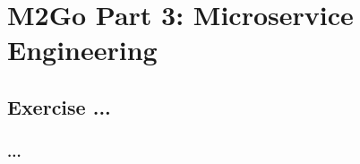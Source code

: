 \chapter{M2Go Part 3: Microservice Engineering}
\label{cha:microservice_engineering}

\section{Exercise ...}

\subsection{...}

